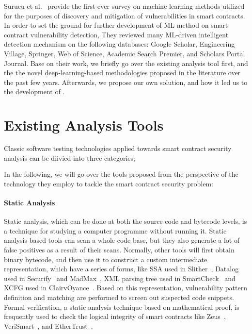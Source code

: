 Surucu et al.~\cite{surucu2022survey} provide the first-ever survey on machine learning methods utilized for the purposes of discovery and mitigation of vulnerabilities in smart contracts.
In order to set the ground for further development of ML method on smart contract vulnerability detection, They reviewed many ML-driven intelligent detection mechanism on the following databases: Google Scholar, Engineering Village, Springer, Web of Science, Academic Search Premier, and Scholars Portal Journal.
Base on their work, we briefly go over the existing analysis tool first, and the the novel deep-learning-based methodologies proposed in the literature over the past few years.
Afterwards, we propose our own solution, \slithersimil and how it led us to the development of \etherbase.


\section{Existing Analysis Tools}

Classic software testing technologies applied towards smart contract security analysis can be diivied into three categories;

In the following, we will go over the tools proposed from the perspective of the technology they employ to tackle the smart contract security problem:

\paragraph{Static Analysis}
Static analysis, which can be done at both the source code and bytecode levels, is a technique for studying a computer programme without running it.
Static analysis-based tools can scan a whole code base, but they also generate a lot of false positives as a result of their scans.
Normally, other tools will first obtain binary bytecode, and then use it to construct a custom intermediate representation, which have a series of forms, like SSA used in Slither~\cite{slither}, Datalog used in Securify~\cite{securify} and MadMax~\cite{madmax}, XML parsing tree used in SmartCheck~\cite{smartcheck} and XCFG used in ClairvOyance~\cite{ClairvOyance}.
Based on this representation, vulnerability pattern definition and matching are performed to screen out suspected code snippets.
Formal verification, a static analysis technique based on mathematical proof, is frequently used to check the logical integrity of smart contracts
like Zeus~\cite{kalra2018zeus}, VeriSmart~\cite{verismart}, and EtherTrust~\cite{etehrTrust}.


